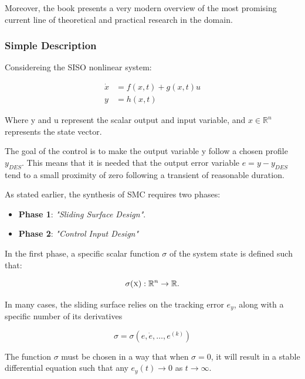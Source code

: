 \documentclass{thesisreport}
\begin{document}
Moreover, the book \cite{Bartolini2008} presents a very modern overview of the most promising current line of theoretical and practical research in the domain.

 
 \subsubsection{Simple Description}
 
 Considereing the SISO nonlinear system:
 
 \begin{align}
 \dot{x} &=f(x,t)+g(x,t)u \label{SISO_1}\\
 y &= h(x,t) \label{SISO_2}
 \end{align}


Where y and u represent the scalar output and input variable, and $x \in \mathbb{R}^n$ represents the state vector.



The goal of the control is to make the output variable y follow a chosen profile $y_{DES}$. This means that it is needed that the
output error variable $e=y-y_{DES}$ tend to a small proximity of zero following a transient of reasonable duration.


As stated earlier, the synthesis of SMC requires two phases:

\begin{itemize}
	\item [] \textbf{Phase 1}: \textit{"Sliding Surface Design"}.
	\item [] \textbf{Phase 2}: \textit{"Control Input Design"}
\end{itemize}


In the first phase, a specific scalar function $\sigma$ of the system state is defined such that:

\begin{equation*}
	\sigma({\textsc{x}}):\mathbb{R}^n \rightarrow \mathbb{R}.
\end{equation*}


In many cases, the sliding surface relies on the tracking error $e_y$, along with a specific number of its derivatives

\begin{equation}
	\sigma = \sigma(e,\dot{e},\ldots,e^{(k)})
\end{equation}


The function $\sigma$ must be chosen in a way that when $\sigma=0$, it will result in a stable differential equation such that any $e_y(t) \rightarrow 0$ as $t \rightarrow \infty$.
\end{document}
